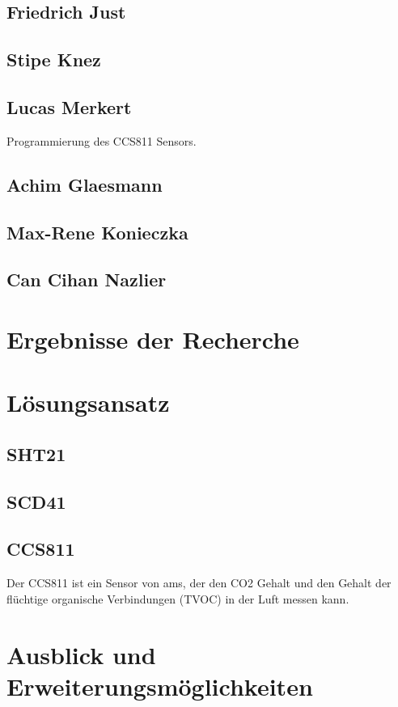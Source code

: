 \documentclass[]{article}
\begin{document}
		\subsection{Friedrich Just}
		\subsection{Stipe Knez}
		\subsection{Lucas Merkert}
			Programmierung des CCS811 Sensors.
		\subsection{Achim Glaesmann}
		\subsection{Max-Rene Konieczka}
		\subsection{Can Cihan Nazlier}
		
	\section{Ergebnisse der Recherche}%
	\section{Lösungsansatz} %
		\subsection{SHT21}
		\subsection{SCD41}
		\subsection{CCS811}
			Der CCS811 ist ein Sensor von ams, der den CO2 Gehalt und den Gehalt der flüchtige organische Verbindungen (TVOC) in der Luft messen kann.
		
	\section{Ausblick und Erweiterungsmöglichkeiten}
		
\end{document}
